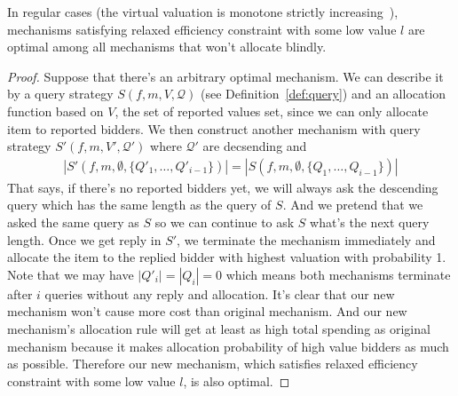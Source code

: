 
\begin{theorem}
In regular cases (the virtual valuation is monotone strictly increasing~\cite{}),
mechanisms satisfying relaxed efficiency constraint with some low value $l$ are
optimal among all mechanisms that won't allocate blindly.

\end{theorem}

\begin{proof}
Suppose that there's an arbitrary optimal mechanism. We can describe it by a
query strategy $S(f, m, V, \mathcal Q)$ (see Definition~\ref{def:query}) and an
allocation function based on $V$, the set of reported values set, since we can
only allocate item to reported bidders. We then construct another mechanism
with query strategy $S'(f, m, V', \mathcal Q')$ where $\mathcal Q'$ are decsending
and 
\begin{align*}
|S'(f, m, \emptyset, \{Q'_1, \ldots, Q'_{i-1}\})| %
  = |S(f, m, \emptyset, \{Q_1, \ldots, Q_{i-1}\})|
\end{align*}
That says, if there's no reported bidders yet, we will always ask the
descending query which has the same length as the query of $S$. And we pretend
that we asked the same query as $S$ so we can continue to ask $S$ what's the
next query length. Once we get reply in $S'$, we terminate the mechanism
immediately and allocate the item to the replied bidder with highest valuation
with probability 1.  Note that we may have $|Q'_i| = |Q_i| = 0$ which means
both mechanisms terminate after $i$ queries without any reply and allocation.
It's clear that our new mechanism won't cause more cost than original
mechanism.  And our new mechanism's allocation rule will get at least as high
total spending as original mechanism because it makes allocation probability of
high value bidders as much as possible. Therefore our new mechanism, which
satisfies relaxed efficiency constraint with some low value $l$, is also
optimal.

\end{proof}

